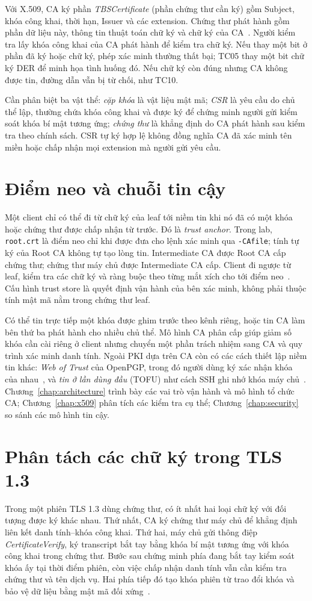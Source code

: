 Với X.509, CA ký phần \emph{TBSCertificate} (phần chứng thư cần ký) gồm Subject, khóa công khai, thời hạn, Issuer và các extension. Chứng thư phát hành gồm phần dữ liệu này, thông tin thuật toán chữ ký và chữ ký của CA~\cite{rfc5280}. Người kiểm tra lấy khóa công khai của CA phát hành để kiểm tra chữ ký. Nếu thay một bit ở phần đã ký hoặc chữ ký, phép xác minh thường thất bại; TC05 thay một bit chữ ký DER để minh họa tình huống đó. Nếu chữ ký còn đúng nhưng CA không được tin, đường dẫn vẫn bị từ chối, như TC10.

Cần phân biệt ba vật thể: \emph{cặp khóa} là vật liệu mật mã; \emph{CSR} là yêu cầu do chủ thể lập, thường chứa khóa công khai và được ký để chứng minh người gửi kiểm soát khóa bí mật tương ứng; \emph{chứng thư} là khẳng định do CA phát hành sau kiểm tra theo chính sách. CSR tự ký hợp lệ không đồng nghĩa CA đã xác minh tên miền hoặc chấp nhận mọi extension mà người gửi yêu cầu.

\section{Điểm neo và chuỗi tin cậy}
Một client chỉ có thể đi từ chữ ký của leaf tới niềm tin khi nó đã có một khóa hoặc chứng thư được chấp nhận từ trước. Đó là \emph{trust anchor}. Trong lab, \texttt{root.crt} là điểm neo chỉ khi được đưa cho lệnh xác minh qua \texttt{-CAfile}; tính tự ký của Root CA không tự tạo lòng tin. Intermediate CA được Root CA cấp chứng thư; chứng thư máy chủ được Intermediate CA cấp. Client đi ngược từ leaf, kiểm tra các chữ ký và ràng buộc theo từng mắt xích cho tới điểm neo~\cite{rfc5280}. Cấu hình trust store là quyết định vận hành của bên xác minh, không phải thuộc tính mật mã nằm trong chứng thư leaf.

Có thể tin trực tiếp một khóa được ghim trước theo kênh riêng, hoặc tin CA làm bên thứ ba phát hành cho nhiều chủ thể. Mô hình CA phân cấp giúp giảm số khóa cần cài riêng ở client nhưng chuyển một phần trách nhiệm sang CA và quy trình xác minh danh tính. Ngoài PKI dựa trên CA còn có các cách thiết lập niềm tin khác: \emph{Web of Trust} của OpenPGP, trong đó người dùng ký xác nhận khóa của nhau~\cite{rfc9580}, và \emph{tin ở lần dùng đầu} (TOFU) như cách SSH ghi nhớ khóa máy chủ~\cite{rfc4251}. Chương~\ref{chap:architecture} trình bày các vai trò vận hành và mô hình tổ chức CA; Chương~\ref{chap:x509} phân tích các kiểm tra cụ thể; Chương~\ref{chap:security} so sánh các mô hình tin cậy.

\section{Phân tách các chữ ký trong TLS 1.3}
Trong một phiên TLS 1.3 dùng chứng thư, có ít nhất hai loại chữ ký với đối tượng được ký khác nhau. Thứ nhất, CA ký chứng thư máy chủ để khẳng định liên kết danh tính--khóa công khai. Thứ hai, máy chủ gửi thông điệp \emph{CertificateVerify}, ký transcript bắt tay bằng khóa bí mật tương ứng với khóa công khai trong chứng thư. Bước sau chứng minh phía đang bắt tay kiểm soát khóa ấy tại thời điểm phiên, còn việc chấp nhận danh tính vẫn cần kiểm tra chứng thư và tên dịch vụ. Hai phía tiếp đó tạo khóa phiên từ trao đổi khóa và bảo vệ dữ liệu bằng mật mã đối xứng~\cite{rfc8446}.

